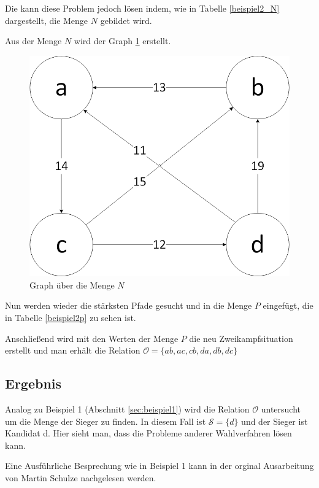 Die \schulze kann diese Problem jedoch lösen indem, wie in Tabelle \ref{beispiel2_N} dargestellt, die Menge $N$ gebildet wird.



Aus der Menge $N$ wird der Graph \ref{fig:graph2} erstellt.

\begin{figure}[!h]
\centering
\includegraphics[scale=0.5]{Bilder/Beispiel2_Graph.png}
\caption{Graph über die Menge $N$}
\label{fig:graph2}
\end{figure}

Nun werden wieder die stärksten Pfade gesucht und in die Menge $P$ eingefügt, die in Tabelle \ref{beispiel2p} zu sehen ist.



Anschließend wird mit den Werten der Menge $P$ die neu Zweikampfsituation erstellt und man erhält die Relation $\mathcal{O} = \{ ab,ac,cb,da,db,dc \}$


\subsection{Ergebnis} 
\label{sec:ergebnis2}
Analog zu Beispiel 1 (Abschnitt \ref{sec:beispiel1}) wird die Relation $\mathcal{O}$ untersucht um die Menge der Sieger zu finden. In diesem Fall ist $\mathcal{S}=\{d\}$  und der Sieger ist Kandidat d. Hier sieht man, dass die \schulze Probleme anderer Wahlverfahren lösen kann.

Eine Ausführliche Besprechung wie in Beispiel 1 kann in der orginal Ausarbeitung von Martin Schulze nachgelesen werden. \citep{Schulze2017}
